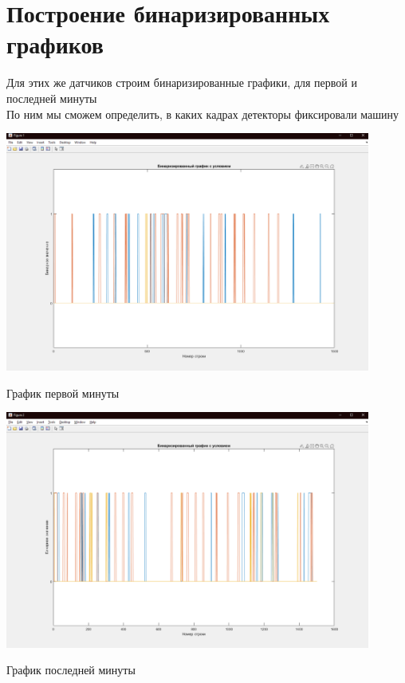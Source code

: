 \documentclass[a4paper,12pt]{article}
\begin{document}
\newpage
\section*{Построение бинаризированных графиков}
Для этих же датчиков строим бинаризированные графики, для первой и последней минуты\\
По ним мы сможем определить, в каких кадрах детекторы фиксировали машину
\begin{center}
\includegraphics[width=0.9\textwidth]{binary_first.png}
\end{center}
\begin{center}
График первой минуты
\end{center}
\begin{center}
\includegraphics[width=0.9\textwidth]{binary_last.png}
\end{center}
\begin{center}
График последней минуты 
\end{center}
\end{document}
